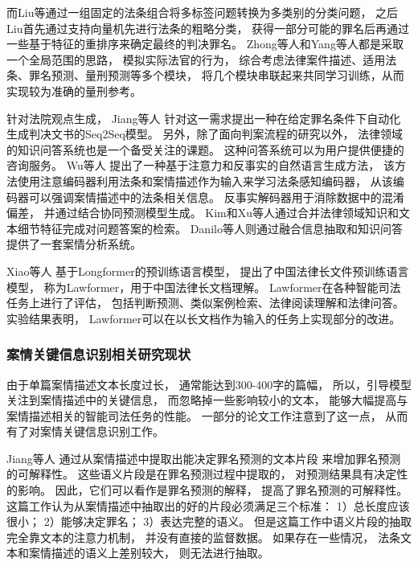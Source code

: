 而Liu等通过一组固定的法条组合将多标签问题转换为多类别的分类问题，
之后Liu首先通过支持向量机先进行法条的粗略分类，
获得一部分可能的罪名后再通过一些基于特征的重排序来确定最终的判决罪名。
Zhong等人和Yang等人都是采取一个全局范围的思路，
模拟实际法官的行为，
综合考虑法律案件描述、适用法条、罪名预测、量刑预测等多个模块，
将几个模块串联起来共同学习训练，从而实现较为准确的量刑参考。

针对法院观点生成，
Jiang等人
针对这一需求提出一种在给定罪名条件下自动化生成判决文书的Seq2Seq模型。
另外，除了面向判案流程的研究以外，
法律领域的知识问答系统也是一个备受关注的课题。
这种问答系统可以为用户提供便捷的咨询服务。
Wu等人
提出了一种基于注意力和反事实的自然语言生成方法，
该方法使用注意编码器利用法条和案情描述作为输入来学习法条感知编码器，
从该编码器可以强调案情描述中的法条相关信息。
反事实解码器用于消除数据中的混淆偏差，
并通过结合协同预测模型生成。
Kim和Xu等人通过合并法律领域知识和文本细节特征完成对问题答案的检索。
Danilo等人则通过融合信息抽取和知识问答提供了一套案情分析系统。

Xiao等人
基于Longformer的预训练语言模型，
提出了中国法律长文件预训练语言模型，
称为Lawformer，用于中国法律长文档理解。
Lawformer在各种智能司法任务上进行了评估，
包括判断预测、类似案例检索、法律阅读理解和法律问答。
实验结果表明，
Lawformer可以在以长文档作为输入的任务上实现部分的改进。

\subsubsection{案情关键信息识别相关研究现状}

由于单篇案情描述文本长度过长，
通常能达到300-400字的篇幅，
所以，引导模型关注到案情描述中的关键信息，
而忽略掉一些影响较小的文本，
能够大幅提高与案情描述相关的智能司法任务的性能。
一部分的论文工作注意到了这一点，
从而有了对案情关键信息识别工作。

Jiang等人
通过从案情描述中提取出能决定罪名预测的文本片段
来增加罪名预测的可解释性。
这些语义片段是在罪名预测过程中提取的，
对预测结果具有决定性的影响。
因此，它们可以看作是罪名预测的解释，
提高了罪名预测的可解释性。
这篇工作认为从案情描述中抽取出的好的片段必须满足三个标准：
1）总长度应该很小； 
2）能够决定罪名； 
3）表达完整的语义。
但是这篇工作中语义片段的抽取完全靠文本的注意力机制，
并没有直接的监督数据。
如果存在一些情况，
法条文本和案情描述的语义上差别较大，
则无法进行抽取。

